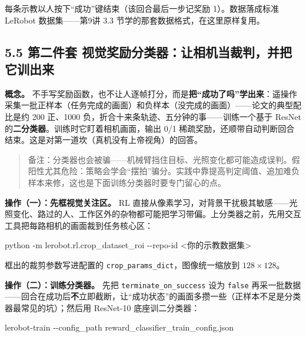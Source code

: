 \documentclass[
  chinese,
]{ctexart}
\newenvironment{Shaded}{\begin{snugshade}}{\end{snugshade}}
\newcommand{\AttributeTok}[1]{\textcolor[rgb]{0.40,0.45,0.13}{#1}}
\newcommand{\ExtensionTok}[1]{\textcolor[rgb]{0.00,0.23,0.31}{#1}}
\newcommand{\NormalTok}[1]{\textcolor[rgb]{0.00,0.23,0.31}{#1}}
\newcommand{\OperatorTok}[1]{\textcolor[rgb]{0.37,0.37,0.37}{#1}}
\begin{document}
每条示教以人按下``成功''键结束（该回合最后一步记奖励 1）。数据落成标准
LeRobot 数据集------第9讲 3.3 节学的那套数据格式，在这里原样复用。

\subsection{5.5 第二件套
视觉奖励分类器：让相机当裁判，并把它训出来}\label{ux7b2cux4e8cux4ef6ux5957-ux89c6ux89c9ux5956ux52b1ux5206ux7c7bux5668ux8ba9ux76f8ux673aux5f53ux88c1ux5224ux5e76ux628aux5b83ux8badux51faux6765}

\textbf{概念。}
不手写奖励函数，也不让人逐帧打分，而是\textbf{把``成功了吗''学出来}：遥操作采集一批正样本（任务完成的画面）和负样本（没完成的画面）------论文的典型配比是约
200 正、1000 负，折合十来条轨迹、五分钟的事------训练一个基于 ResNet
的\textbf{二分类器}。训练时它盯着相机画面，输出 0/1
稀疏奖励，还顺带自动判断回合结束。这是对第一道坎（真机没有上帝视角）的回答。

\begin{quote}
备注：分类器也会被骗------机械臂挡住目标、光照变化都可能造成误判。假阳性尤其危险：策略会学会``摆拍''骗分。实践中靠提高判定阈值、追加难负样本来修，这也是下面训练分类器时要专门留心的点。
\end{quote}

\textbf{操作（一）：先框视觉关注区。} RL
直接从像素学习，对背景干扰极其敏感------光照变化、路过的人、工作区外的杂物都可能把学习带偏。上分类器之前，先用交互工具把每路相机的画面裁到任务核心区：

\begin{Shaded}
\begin{Highlighting}[]
\ExtensionTok{python} \AttributeTok{{-}m}\NormalTok{ lerobot.rl.crop\_dataset\_roi }\AttributeTok{{-}{-}repo{-}id} \OperatorTok{\textless{}}\NormalTok{你的示教数据集}\OperatorTok{\textgreater{}}
\end{Highlighting}
\end{Shaded}

框出的裁剪参数写进配置的 \texttt{crop\_params\_dict}，图像统一缩放到
\(128\times128\)。

\textbf{操作（二）：训练分类器。} 先把 \texttt{terminate\_on\_success}
设为 \texttt{false}
再采一批数据------回合在成功后\textbf{不}立即截断，让``成功状态''的画面多攒一些（正样本不足是分类器最常见的坑）；然后用
ResNet-10 底座训二分类器：

\begin{Shaded}
\begin{Highlighting}[]
\ExtensionTok{lerobot{-}train} \AttributeTok{{-}{-}config\_path}\NormalTok{ reward\_classifier\_train\_config.json}
\end{Highlighting}
\end{Shaded}
\end{document}
